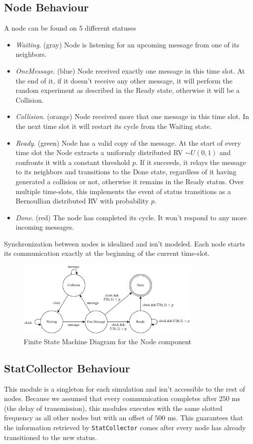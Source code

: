 \subsection{Node Behaviour}
A node can be found on 5 different statuses
\begin{itemize}
\item \textit{Waiting}. (gray) Node is listening for an upcoming message from one of its neighbors.
\item \textit{OneMessage}. (blue) Node received exactly one message in this time slot. At the end of it, if it doesn't receive any other message, it will perform the random experiment as described in the Ready state, otherwise it will be a Collision.
\item \textit{Collision}. (orange) Node received more that one message in this time slot. In the next time slot it will restart its cycle from the Waiting state.
\item \textit{Ready}. (green) Node has a valid copy of the message. At the start of every time slot the Node extracts a uniformly distributed RV $\sim U(0,1)$ and confronts it with a constant threshold $p$. If it succeeds, it relays the message to its neighbors and transitions to the Done state, regardless of it having generated a collision or not, otherwise it remains in the Ready status. Over multiple time-slots, this implements the event of status transitions as a Bernoullian distributed RV with probability $p$.
\item \textit{Done}. (red) The node has completed its cycle. It won't respond to any more incoming messages. 
\end{itemize}
Synchronization between nodes is idealized and isn't modeled. Each node starts its communication exactly at the beginning of the current time-slot.

\begin{figure}
\centering
\includegraphics[width=0.8\textwidth]{./images/fsm.png}
\caption{Finite State Machine Diagram for the Node component}
\label{fig:fsm}
\end{figure}
\subsection{StatCollector Behaviour}
This module is a singleton for each simulation and isn't accessible to the rest of nodes. Because we assumed that every communication completes after $250$ ms (the delay of transmission), this modules executes with the same slotted frequency as all other nodes but with an offset of $500$ ms. This guarantees that the information retrieved by \texttt{StatCollector} comes after every node has already transitioned to the new status. 

